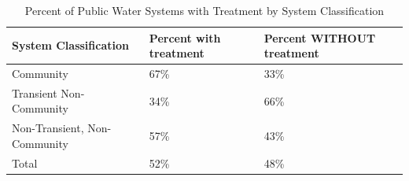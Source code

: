 \begin{table}[]
\begin{tabular}{|l|l|l|}
\hline
System   Classification        & Percent   with   treatment & Percent   WITHOUT treatment \\ \hline
Community                      & 67\%                       & 33\%                        \\ \hline
Transient   Non-Community      & 34\%                       & 66\%                        \\ \hline
Non-Transient,   Non-Community & 57\%                       & 43\%                        \\ \hline
Total                          & 52\%                       & 48\%                        \\ \hline
\end{tabular}
\caption{Percent of Public Water Systems with Treatment by System Classification}
\end{table}





